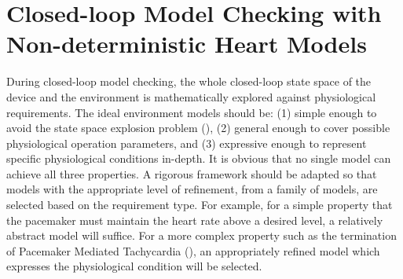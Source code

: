 \section{Closed-loop Model Checking with Non-deterministic Heart Models }
During closed-loop model checking, the whole closed-loop state space of the device and the environment is mathematically explored against physiological requirements. The  ideal environment models should be: (1) simple enough to avoid the state space explosion problem (\cite{Abstraction}), (2) general enough to cover possible physiological operation parameters, and (3) expressive enough to represent specific physiological conditions in-depth. It is obvious that no single model can achieve all three properties. A rigorous framework should be adapted so that models with the appropriate level of refinement, from a family of models, are selected based on the requirement type. For example, for a simple property that the pacemaker must maintain the heart rate above a desired level, a relatively abstract model will suffice. For a more complex property such as the termination of Pacemaker Mediated Tachycardia (\cite{josephson}), an appropriately refined model which expresses the physiological condition will be selected.

